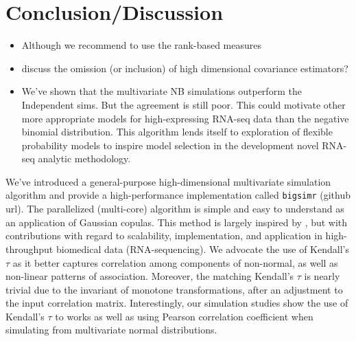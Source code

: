 \documentclass[
]{article}
\providecommand{\tightlist}{%
  \setlength{\itemsep}{0pt}\setlength{\parskip}{0pt}}
\begin{document}
\hypertarget{conclusiondiscussion}{%
\section{Conclusion/Discussion}\label{conclusiondiscussion}}

\begin{itemize}
\tightlist
\item
  Although we recommend to use the rank-based measures
\item
  discuss the omission (or inclusion) of high dimensional covariance estimators?
\item
  We've shown that the multivariate NB simulations outperform the Independent sims. But the agreement is still poor. This could motivate other more appropriate models for high-expressing RNA-seq data than the negative binomial distribution. This algorithm lends itself to exploration of flexible probability models to inspire model selection in the development novel RNA-seq analytic methodology.
\end{itemize}

We've introduced a general-purpose high-dimensional multivariate simulation algorithm and provide a high-performance implementation called \texttt{bigsimr} (github url). The parallelized (multi-core) algorithm is simple and easy to understand as an application of Gaussian copulas. This method is largely inspired by \citet{MB13}, but with contributions with regard to scalability, implementation, and application in high-throughput biomedical data (RNA-sequencing). We advocate the use of Kendall's \(\tau\) as it better captures correlation among components of non-normal, as well as non-linear patterns of association. Moreover, the matching Kendall's \(\tau\) is nearly trivial due to the invariant of monotone transformations, after an adjustment to the input correlation matrix. Interestingly, our simulation studies show the use of Kendall's \(\tau\) to works as well as using Pearson correlation coefficient when simulating from multivariate normal distributions.
\end{document}
